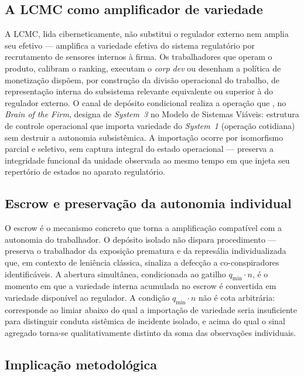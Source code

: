\documentclass[12pt,a4paper]{article}
\begin{document}
\subsection{A LCMC como amplificador de variedade}

A LCMC, lida ciberneticamente, não substitui o regulador externo nem amplia seu
efetivo --- amplifica a variedade efetiva do sistema regulatório por recrutamento
de sensores internos à firma. Os trabalhadores que operam o produto, calibram o
ranking, executam o \emph{corp dev} ou desenham a política de monetização
dispõem, por construção da divisão operacional do trabalho, de representação
interna do subsistema relevante equivalente ou superior à do regulador externo.
O canal de depósito condicional realiza a operação que \citet{beer1972brain},
no \emph{Brain of the Firm}, designa de \emph{System~3} no Modelo de Sistemas
Viáveis: estrutura de controle operacional que importa variedade do
\emph{System~1} (operação cotidiana) sem destruir a autonomia subsistêmica.
A importação ocorre por isomorfismo parcial e seletivo, sem captura integral do
estado operacional --- preserva a integridade funcional da unidade observada ao
mesmo tempo em que injeta seu repertório de estados no aparato regulatório.

\subsection{Escrow e preservação da autonomia individual}

O escrow é o mecanismo concreto que torna a amplificação compatível com a
autonomia do trabalhador. O depósito isolado não dispara procedimento --- preserva
o trabalhador da exposição prematura e da represália individualizada que, em
contexto de leniência clássica, sinaliza a defecção a co-conspiradores
identificáveis. A abertura simultânea, condicionada ao gatilho $q_{\min}\cdot n$,
é o momento em que a variedade interna acumulada no escrow é convertida em
variedade disponível ao regulador. A condição $q_{\min}\cdot n$ não é cota
arbitrária: corresponde ao limiar abaixo do qual a importação de variedade seria
insuficiente para distinguir conduta sistêmica de incidente isolado, e acima do
qual o sinal agregado torna-se qualitativamente distinto da soma das observações
individuais.

\subsection{Implicação metodológica}
\end{document}
